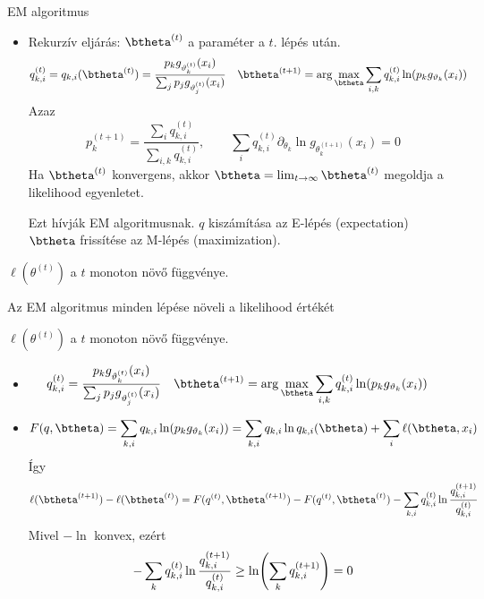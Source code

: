 \documentclass[aspectratio=169,notheorems,9pt,\option]{beamer}
\begin{document}
\begin{frame}{EM algoritmus}
  \begin{itemize}
    \item Rekurzív eljárás: $\btheta^{(t)}$ a paraméter a $t$. lépés után.
    \begin{align*}
      q_{k,i}^{(t)}=q_{k,i}(\btheta^{(t)}) &= \frac{p_k g_{\theta^{(t)}_k}(x_i)}{\sum_j p_j g_{\theta^{(t)}_j}(x_i)} &
      \btheta^{(t+1)} &=\arg\max_{\btheta} \sum_{i,k} q_{k,i}^{(t)} \ln (p_k g_{\theta_k}(x_i))
    \end{align*}    
    Azaz
    \begin{displaymath}
       p^{(t+1)}_k = \frac{\sum_{i} q_{k,i}^{(t)}}{\sum_{i,k} q_{k,i}^{(t)}} ,
      \qquad  
      \sum_{i} q_{k,i}^{(t)} \partial_{\theta_k}\ln g_{\theta^{(t+1)}_k}(x_i)=0 
    \end{displaymath}
    Ha $\btheta^{(t)}$ konvergens, akkor $\btheta=\lim_{t\to\infty}\btheta^{(t)}$ megoldja a likelihood egyenletet.

    Ezt hívják EM algoritmusnak. $q$ kiszámítása az E-lépés (expectation) 
    $\btheta$ frissítése az M-lépés (maximization).
  \end{itemize}

  \begin{proposition}
    $\ell(\theta^{(t)})$ a  $t$ monoton növő függvénye. 
  \end{proposition}
\end{frame}


\begin{frame}{Az EM algoritmus minden lépése növeli  a likelihood értékét} 
  \begin{proposition}
    $\ell(\theta^{(t)})$ a  $t$ monoton növő függvénye. 
  \end{proposition}
  \begin{itemize}
    \item 
    \begin{align*}
      q_{k,i}^{(t)} &= \frac{p_k g_{\theta^{(t)}_k}(x_i)}{\sum_j p_j g_{\theta^{(t)}_j}(x_i)} &
      \btheta^{(t+1)} &=\arg\max_{\btheta} \sum_{i,k} q_{k,i}^{(t)} \ln (p_k g_{\theta_k}(x_i))
    \end{align*} 
    \item 
    \begin{displaymath}
      F(q,\btheta) = \sum_{k,i} q_{k,i} \ln (p_k g_{\theta_k}(x_i))= \sum_{k,i} q_{k,i}\ln q_{k,i}(\btheta)+\sum_i \ell(\btheta,x_i)
    \end{displaymath}
    Így 
    \begin{displaymath}
      \ell(\btheta^{(t+1)})-\ell(\btheta^{(t)}) = 
      F(q^{(t)},\btheta^{(t+1)})-F(q^{(t)},\btheta^{(t)}) - \sum_{k,i} q^{(t)}_{k,i}\ln\frac{q^{(t+1)}_{k,i}}{q^{(t)}_{k,i}}
    \end{displaymath}
    Mivel $-\ln$ konvex, ezért
    \begin{displaymath} 
      -\sum_{k} q^{(t)}_{k,i}\ln\frac{q^{(t+1)}_{k,i}}{q^{(t)}_{k,i}}\geq \ln\zjel*{\sum_k q^{(t+1)}_{k,i}}=0 
    \end{displaymath}
  \end{itemize}
\end{frame}
\end{document}

